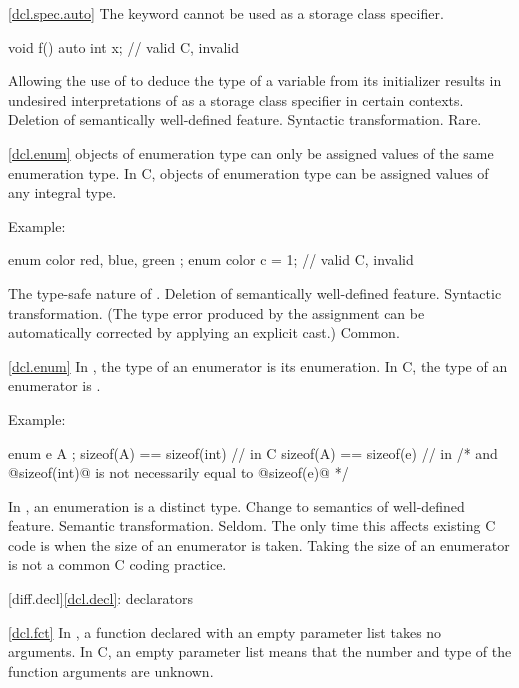 \ref{dcl.spec.auto}
\change
The keyword  cannot be used as a storage class specifier.

\begin{codeblock}
void f() {
  auto int x;     // valid C, invalid \Cpp
}
\end{codeblock}

\rationale Allowing the use of  to deduce the type
of a variable from its initializer results in undesired interpretations of
 as a storage class specifier in certain contexts.
\effect Deletion of semantically well-defined feature.
\difficulty Syntactic transformation.
\howwide Rare.

\ref{dcl.enum}
\change \Cpp objects of enumeration type can only be assigned values of the same enumeration type.
In C, objects of enumeration type can be assigned values of any integral type.

Example:
\begin{codeblock}
enum color { red, blue, green };
enum color c = 1;               // valid C, invalid \Cpp
\end{codeblock}

\rationale
The type-safe nature of \Cpp.
\effect
Deletion of semantically well-defined feature.
\difficulty
Syntactic transformation.
(The type error produced by the assignment can be automatically
corrected by applying an explicit cast.)
\howwide
Common.

\ref{dcl.enum}
\change In \Cpp, the type of an enumerator is its enumeration. In C, the type of an enumerator is .

Example:

\begin{codeblock}
enum e { A };
sizeof(A) == sizeof(int)        // in C
sizeof(A) == sizeof(e)          // in \Cpp
/* and @sizeof(int)@ is not necessarily equal to @sizeof(e)@ */
\end{codeblock}

\rationale
In \Cpp, an enumeration is a distinct type.
\effect
Change to semantics of well-defined feature.
\difficulty
Semantic transformation.
\howwide
Seldom.
The only time this affects existing C code is when the size of an
enumerator is taken.
Taking the size of an enumerator is not a
common C coding practice.

[diff.decl]{\ref{dcl.decl}: declarators}

\ref{dcl.fct}
\change In \Cpp, a function declared with an empty parameter list takes no arguments.
In C, an empty parameter list means that the number and type of the function arguments are unknown.

